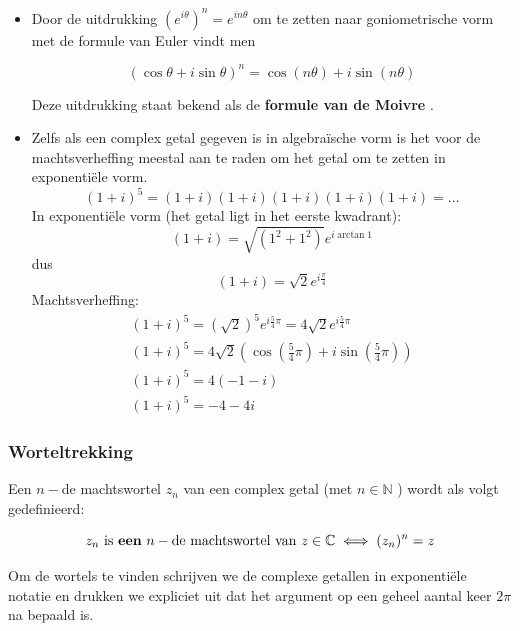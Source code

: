 \begin{opmerking}
	

\begin{itemize}
	\item Door de uitdrukking $(e^{i \theta})^n = e^{i n \theta}$ om te zetten naar goniometrische vorm met de formule van Euler vindt men
	\begin{eigenschap}
		\[  (\cos \theta + i \sin \theta)^n = \cos (n\theta)+i \sin(n \theta) \]
	\end{eigenschap}
	Deze uitdrukking staat bekend als de {\bf formule van de Moivre }. 
	\item Zelfs als een complex getal gegeven is in algebra\"{i}sche vorm is het voor de machtsverheffing meestal aan te raden om het getal om te zetten in exponenti\"{e}le vorm.\\
	\[ (1+i)^5 = (1+i)(1+i)(1+i)(1+i)(1+i)=... \]
	In exponenti\"{e}le vorm (het getal ligt in het eerste kwadrant):\\
	\[ (1+i) = \sqrt{(1^2 + 1^2)} e^{i \arctan{1}}    \]
	dus
	\[  (1+i)= \sqrt{2} e^{i \frac{\pi}{4}} \]
	Machtsverheffing:
	\[ \begin{array}{l} (1+i)^5 = (\sqrt{2})^5 e^{i \frac{5}{4} \pi}= 4\sqrt{2}e^{i \frac{5}{4} \pi} \\
	(1+i)^5 = 4\sqrt{2} (\cos(\frac{5}{4} \pi)+i\sin(\frac{5}{4} \pi)) \\
	(1+i)^5 = 4 (-1 -i) \\
	(1+i)^5 = -4-4i \end{array}  \]
	
\end{itemize}

\end{opmerking}
\subsubsection{Worteltrekking}

\begin{definitie}
	Een $n-$de machtswortel $z_n$ van een complex getal (met $n \in \mathbb{N}$ ) wordt als volgt gedefinieerd:\\

\begin{framed}
	\[  z_{n} \text{ is {\bf een} } n-\text{de machtswortel van } z \in \mathbb{C} \iff (z_{n})^n = z  \] 
\end{framed}
\end{definitie}

Om de wortels te vinden schrijven we de complexe getallen in exponenti\"{e}le notatie en drukken we expliciet uit dat het argument op een geheel aantal keer $2 \pi$ na bepaald is.\\

